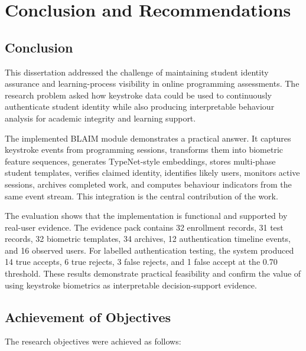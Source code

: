 \chapter{Conclusion and Recommendations}
\label{chap:conclusion}

\section{Conclusion}
\label{sec:final-conclusion}

This dissertation addressed the challenge of maintaining student identity assurance and learning-process visibility in online programming assessments. The research problem asked how keystroke data could be used to continuously authenticate student identity while also producing interpretable behaviour analysis for academic integrity and learning support.

The implemented BLAIM module demonstrates a practical answer. It captures keystroke events from programming sessions, transforms them into biometric feature sequences, generates TypeNet-style embeddings, stores multi-phase student templates, verifies claimed identity, identifies likely users, monitors active sessions, archives completed work, and computes behaviour indicators from the same event stream. This integration is the central contribution of the work.

The evaluation shows that the implementation is functional and supported by real-user evidence. The evidence pack contains 32 enrollment records, 31 test records, 32 biometric templates, 34 archives, 12 authentication timeline events, and 16 observed users. For labelled authentication testing, the system produced 14 true accepts, 6 true rejects, 3 false rejects, and 1 false accept at the 0.70 threshold. These results demonstrate practical feasibility and confirm the value of using keystroke biometrics as interpretable decision-support evidence.

\section{Achievement of Objectives}
\label{sec:objectives-achieved}

The research objectives were achieved as follows:

